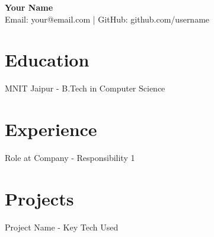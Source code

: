 \documentclass[a4paper,10pt]{article}
\begin{document}
\begin{center}

    {\huge \bf Your Name} \\

    Email: your@email.com | GitHub: github.com/username

\end{center}

\section*{Education}

MNIT Jaipur - B.Tech in Computer Science

\section*{Experience}

Role at Company - Responsibility 1

\section*{Projects}

Project Name - Key Tech Used
\end{document}
